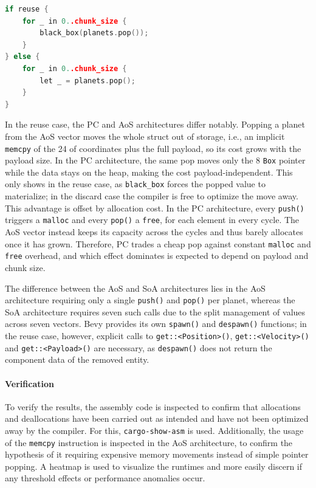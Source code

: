 \begin{lstlisting}[language=C++, caption={Deallocation of planets in \ac{PC} and \ac{AoS} architectures}, label={lst:s3aos}]
if reuse {
    for _ in 0..chunk_size { 
        black_box(planets.pop()); 
    }
} else {
    for _ in 0..chunk_size { 
        let _ = planets.pop(); 
    }
}
\end{lstlisting}

In the reuse case, the \ac{PC} and \ac{AoS} architectures differ notably. Popping a planet from the \ac{AoS} vector moves the whole struct out of storage, i.e., an implicit \texttt{memcpy} of the \qty{24}{\byte} of coordinates plus the full payload, so its cost grows with the payload size. In the \ac{PC} architecture, the same pop moves only the \qty{8}{\byte} \texttt{Box} pointer while the data stays on the heap, making the cost payload-independent. This only shows in the reuse case, as \texttt{black\_box} forces the popped value to materialize; in the discard case the compiler is free to optimize the move away. This advantage is offset by allocation cost. In the \ac{PC} architecture, every \texttt{push()} triggers a \texttt{malloc} and every \texttt{pop()} a \texttt{free}, for each element in every cycle. The \ac{AoS} vector instead keeps its capacity across the cycles and thus barely allocates once it has grown. Therefore, \ac{PC} trades a cheap pop against constant \texttt{malloc} and \texttt{free} overhead, and which effect dominates is expected to depend on payload and chunk size.

The difference between the \ac{AoS} and \ac{SoA} architectures lies in the \ac{AoS} architecture requiring only a single \texttt{push()} and \texttt{pop()} per planet, whereas the \ac{SoA} architecture requires seven such calls due to the split management of values across seven vectors. Bevy provides its own \texttt{spawn()} and \texttt{despawn()} functions; in the reuse case, however, explicit calls to \texttt{get::<Position>()}, \texttt{get::<Velocity>()} and \texttt{get::<Payload>()} are necessary, as \texttt{despawn()} does not return the component data of the removed entity.

\paragraph{Verification}
To verify the results, the assembly code is inspected to confirm that allocations and deallocations have been carried out as intended and have not been optimized away by the compiler. For this, \texttt{cargo-show-asm} \cite{cargo_show_asm} is used. Additionally, the usage of the \texttt{memcpy} instruction is inspected in the \ac{AoS} architecture, to confirm the hypothesis of it requiring expensive memory movements instead of simple pointer popping. A heatmap is used to visualize the runtimes and more easily discern if any threshold effects or performance anomalies occur. 

